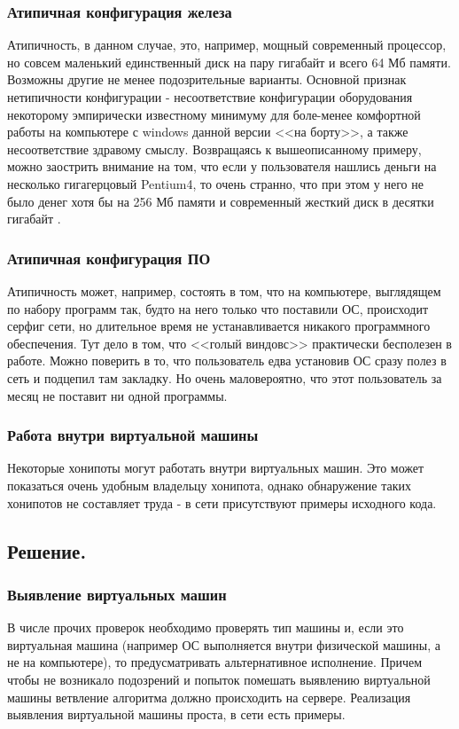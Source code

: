 \subsubsection{Атипичная конфигурация железа}

Атипичность, в данном случае, это, например, мощный современный
процессор, но совсем маленький единственный диск на пару гигабайт и
всего 64 Мб памяти. Возможны другие не менее подозрительные  варианты.
Основной признак нетипичности конфигурации - несоответствие конфигурации
оборудования некоторому эмпирически  известному минимуму для боле-менее
комфортной работы на компьютере с windows данной версии <<на борту>>, а
также несоответствие здравому смыслу. Возвращаясь к вышеописанному
примеру, можно заострить внимание на том, что если у пользователя
нашлись деньги на несколько гигагерцовый Pentium4, то очень странно, что
при этом у него не было денег хотя бы на 256 Мб памяти и современный
жесткий диск в десятки гигабайт .

\subsubsection{Атипичная конфигурация ПО}

Атипичность может, например, состоять в том, что на компьютере,
выглядящем по набору программ так, будто на него только что поставили
ОС, происходит серфиг сети, но длительное время не устанавливается
никакого программного обеспечения. Тут дело в том, что <<голый виндовс>>
практически бесполезен в работе. Можно поверить в то, что пользователь
едва установив ОС сразу полез в сеть и подцепил там закладку. Но очень
маловероятно, что этот пользователь за месяц не поставит ни одной
программы.

\subsubsection{Работа внутри виртуальной машины}

Некоторые хонипоты могут работать внутри виртуальных машин.
Это может показаться очень удобным владельцу хонипота, однако
обнаружение таких хонипотов не составляет труда - в сети присутствуют
примеры исходного кода.


\subsection{Решение.}

\subsubsection{Выявление виртуальных машин}
\label{vm_detection}
В числе прочих проверок необходимо проверять тип машины и, если это
виртуальная машина (например ОС  выполняется внутри {}
физической машины, а не на {} компьютере), то
предусматривать альтернативное исполнение. Причем чтобы не возникало
подозрений и попыток помешать выявлению виртуальной машины ветвление
алгоритма должно происходить на сервере. Реализация выявления
виртуальной машины проста, в сети есть примеры.

